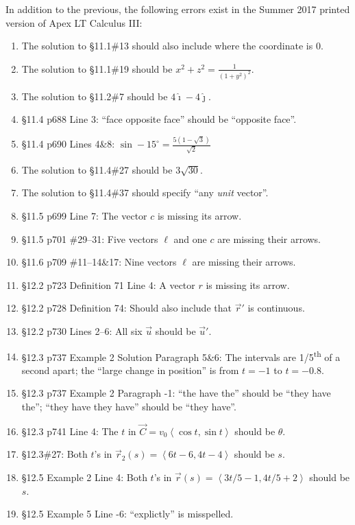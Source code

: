 \documentclass{amsart}
\newcommand{\bracket}[1]{\left\langle#1\right\rangle}
\begin{document}

In addition to the previous, the following errors exist in the Summer 2017 printed version of Apex LT Calculus III:
\begin{enumerate}
\item The solution to \S11.1\#13 should also include where the coordinate is 0.
\item The solution to \S11.1\#19 should be $x^2+z^2=\frac1{(1+y^2)^2}$.\vspace{-.2\baselineskip}
\item The solution to \S11.2\#7 should be $4\hat\imath-4\hat\jmath$.
\item \S11.4 p688 Line 3: ``face opposite face'' should be ``opposite face''.
\item \S11.4 p690 Lines 4\&8: $\sin-15^\circ=\frac{5(1-\sqrt3)}{\sqrt2}$
\item The solution to \S11.4\#27 should be $3\sqrt{30}$.
\item The solution to \S11.4\#37 should specify ``any \emph{unit} vector''.
\item \S11.5 p699 Line 7: The vector $c$ is missing its arrow.
\item \S11.5 p701 \#29--31: Five vectors $\ell$ and one $c$ are missing their arrows.
\item \S11.6 p709 \#11--14\&17: Nine vectors $\ell$ are missing their arrows.
\item \S12.2 p723 Definition 71 Line 4: A vector $r$ is missing its arrow.
\item \S12.2 p728 Definition 74: Should also include that $\vec r'$ is continuous.
\item \S12.2 p730 Lines 2--6: All six $\vec u$ should be $\vec u'$.
\item \S12.3 p737 Example 2 Solution Paragraph 5\&6: The intervals are 1/5\textsuperscript{th} of a second apart; the ``large change in position'' is from $t=-1$ to $t=-0.8$.
\item \S12.3 p737 Example 2 Paragraph -1: ``the have the'' should be ``they have the''; ``they have they have'' should be ``they have''.
\item \S12.3 p741 Line 4: The $t$ in $\vec C = v_0\bracket{\cos t,\sin t}$ should be $\theta$.
\item \S12.3\#27: Both $t$'s in $\vec r_2(s)=\bracket{6t-6,4t-4}$ should be $s$.
\item \S12.5 Example 2 Line 4: Both $t$'s in $\vec r(s)=\bracket{3t/5-1, 4t/5+2}$ should be $s$.
\item \S12.5 Example 5 Line -6: ``explictly'' is misspelled.

\end{enumerate}
\end{document}
